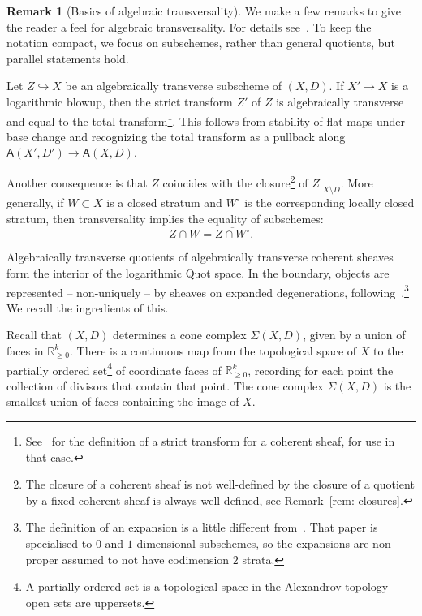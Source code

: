 \documentclass[11pt]{amsart}
\theoremstyle{definition}
\theoremstyle{definition}
\newtheorem{remark}[theorem]{Remark}
\begin{document}
\begin{remark}[Basics of algebraic transversality]
We make a few remarks to give the reader a feel for algebraic transversality. For details see~\cite[Section~3]{Logquot}. To keep the notation compact, we focus on subschemes, rather than general quotients, but parallel statements hold. 

Let $Z\hookrightarrow X$ be an algebraically transverse subscheme of $(X,D)$. If $X'\to X$ is a logarithmic blowup, then the strict transform $Z'$ of $Z$ is algebraically transverse and equal to the total transform\footnote{See~\cite[\href{https://stacks.math.columbia.edu/tag/080C}{Tag 080C}]{stacks-project} for the definition of a strict transform for a coherent sheaf, for use in that case.}. This follows from stability of flat maps under base change and recognizing the total transform as a pullback along $\mathsf A(X',D')\to\mathsf A(X,D)$. 

Another consequence is that $Z$ coincides with the closure\footnote{The closure of a coherent sheaf is not well-defined by the closure of a quotient by a fixed coherent sheaf is always well-defined, see Remark~\ref{rem: closures}.} of $Z|_{X\setminus D}$. More generally, if $W\subset X$ is a closed stratum and $W^\circ$ is the corresponding locally closed stratum, then transversality implies the equality of subschemes:
\[
Z\cap W = \overline{Z\cap W^\circ}.
\]
\end{remark} 



Algebraically transverse quotients of algebraically transverse coherent sheaves form the interior of the logarithmic Quot space. In the boundary, objects are represented -- non-uniquely -- by sheaves on expanded degenerations, following~\cite{Logquot,MR20}.\footnote{The definition of an expansion is a little different from~\cite{MR20}. That paper is specialised to $0$ and $1$-dimensional subschemes, so the expansions are non-proper assumed to not have codimension $2$ strata. } We recall the ingredients of this.

Recall that $(X,D)$ determines a cone complex $\Sigma(X,D)$, given by a union of faces in $\mathbb R_{\geq 0}^k$. There is a continuous map from the topological space of $X$ to the partially ordered set\footnote{A partially ordered set is a topological space in the Alexandrov topology -- open sets are uppersets.} of coordinate faces of $\mathbb R_{\geq 0}^k$, recording for each point the collection of divisors that contain that point. The cone complex $\Sigma(X,D)$ is the smallest union of faces containing the image of $X$.
\end{document}
